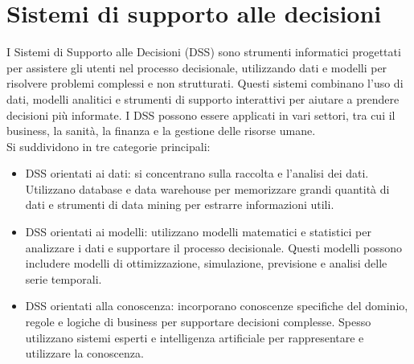 \chapter{Sistemi di supporto alle decisioni}
\label{cap:sistemi-supporto-decisioni}

I Sistemi di Supporto alle Decisioni (DSS) sono strumenti informatici progettati per assistere gli utenti nel processo decisionale, utilizzando dati e modelli per risolvere problemi complessi e non strutturati. Questi sistemi combinano l'uso di dati, modelli analitici e strumenti di supporto interattivi per aiutare a prendere decisioni più informate. I DSS possono essere applicati in vari settori, tra cui il business, la sanità, la finanza e la gestione delle risorse umane.\\
Si suddividono in tre categorie principali:
\begin{itemize}
    \item DSS orientati ai dati: si concentrano sulla raccolta e l'analisi dei dati. Utilizzano database e data warehouse per memorizzare grandi quantità di dati e strumenti di data mining per estrarre informazioni utili.
    \item DSS orientati ai modelli: utilizzano modelli matematici e statistici per analizzare i dati e supportare il processo decisionale. Questi modelli possono includere modelli di ottimizzazione, simulazione, previsione e analisi delle serie temporali.
    \item DSS orientati alla conoscenza: incorporano conoscenze specifiche del dominio, regole e logiche di business per supportare decisioni complesse. Spesso utilizzano sistemi esperti e intelligenza artificiale per rappresentare e utilizzare la conoscenza.
\end{itemize}

